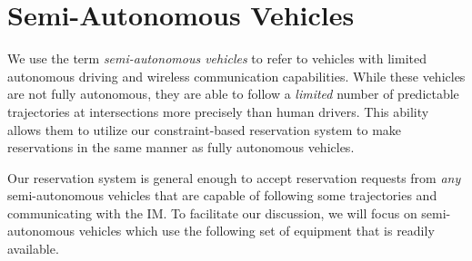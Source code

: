 \section{Semi-Autonomous Vehicles}
\label{sec:vehicles}



We use the term \emph{semi-autonomous vehicles} to
refer to vehicles with limited autonomous driving and wireless
communication capabilities.  While these vehicles are not fully
autonomous, they are able to follow a \emph{limited}
number of predictable trajectories at intersections more precisely
than human drivers.  This ability allows them to utilize our
constraint-based reservation system to make reservations in the same
manner as fully autonomous vehicles.

Our reservation system is general enough to accept
reservation requests from \emph{any} semi-autonomous vehicles that are
capable of following some trajectories and communicating with the IM\@.
To facilitate our discussion, we will focus on semi-autonomous
vehicles which use the following set of equipment that is readily
available.

